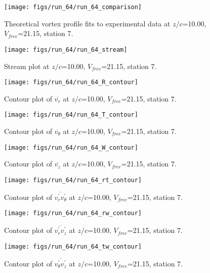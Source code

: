 \begin{figure}[H]
\centering
\texttt{[image: figs/run\_64/run\_64\_comparison]}
\caption{Theoretical vortex profile fits to experimental data at $z/c$=10.00, $V_{free}$=21.15, station 7.}
\end{figure}


\begin{figure}[H]
\centering
\texttt{[image: figs/run\_64/run\_64\_stream]}
\caption{Stream plot at $z/c$=10.00, $V_{free}$=21.15, station 7.}
\end{figure}


\begin{figure}[H]
\centering
\texttt{[image: figs/run\_64/run\_64\_R\_contour]}
\caption{Contour plot of $\overline{v_{r}}$ at $z/c$=10.00, $V_{free}$=21.15, station 7.}
\end{figure}


\begin{figure}[H]
\centering
\texttt{[image: figs/run\_64/run\_64\_T\_contour]}
\caption{Contour plot of $\overline{v_{\theta}}$ at $z/c$=10.00, $V_{free}$=21.15, station 7.}
\end{figure}


\begin{figure}[H]
\centering
\texttt{[image: figs/run\_64/run\_64\_W\_contour]}
\caption{Contour plot of $\overline{v_{z}}$ at $z/c$=10.00, $V_{free}$=21.15, station 7.}
\end{figure}


\begin{figure}[H]
\centering
\texttt{[image: figs/run\_64/run\_64\_rt\_contour]}
\caption{Contour plot of $\overline{v_{r}^{\prime} v_{\theta}^{\prime}}$ at $z/c$=10.00, $V_{free}$=21.15, station 7.}
\end{figure}


\begin{figure}[H]
\centering
\texttt{[image: figs/run\_64/run\_64\_rw\_contour]}
\caption{Contour plot of $\overline{v_{r}^{\prime} v_{z}^{\prime}}$ at $z/c$=10.00, $V_{free}$=21.15, station 7.}
\end{figure}


\begin{figure}[H]
\centering
\texttt{[image: figs/run\_64/run\_64\_tw\_contour]}
\caption{Contour plot of $\overline{v_{\theta}^{\prime} v_{z}^{\prime}}$ at $z/c$=10.00, $V_{free}$=21.15, station 7.}
\end{figure}


